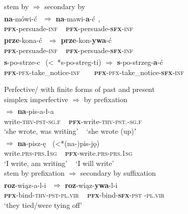 \documentclass[output=paper]{langsci/langscibook}
\begin{document}
\ex
  stem by  ${\Rightarrow}$ secondary  by \\
\gll \textbf{{na}}{-mówi-ć}{\textsuperscript{~}\PFV}   ${\Rightarrow}$     \textbf{{na}}{-mawi-}\textbf{{a}}{-ć}{\textsuperscript{~}\IPFV},\\
\textbf{\textsc{pfx}}-persuade-\textsc{inf}   ~   \textbf{\textsc{pfx}}-persuade-\textbf{\textsc{sfx}}-\textsc{inf}\\

\gll \textbf{{prze}}{-kona-ć}{\textsuperscript{~}\PFV}  ${\Rightarrow}$     \textbf{{prze}}{-kon-}\textbf{{ywa}}{-ć}{\textsuperscript{~}\IPFV}\\
\textbf{\textsc{pfx}}-persuade-\textsc{inf}   ~   \textbf{\textsc{pfx}}-persuade-\textbf{\textsc{sfx}}-\textsc{inf}\\

\gll \textbf{{s}}{-po-strze-c}{\textsuperscript{~}\PFV} (<~*{s-po-streg-ti})   ${\Rightarrow}$   \textbf{{s}}{-po-strzeg-}\textbf{{a}}{-ć}{\textsuperscript{~}\IPFV}\\
\textbf{\textsc{pfx}}\textsc{-pfx}-take\_notice-\textsc{inf} ~ ~ \textbf{\textsc{pfx}}\textsc{-pfx}-take\_notice-\textbf{\textsc{sfx}}-\textsc{inf}\\
\z
\z

\ea
    \label{ex:wiemerserzant:6}
    
      Perfective/  with finite forms of past and present\\
\ea
{simplex imperfective} ${\Rightarrow}$ { by prefixation}\\
    ${\Rightarrow}$   \textbf{{na}}{-pis-a-ł-a}{\textsuperscript{~}\PFV} \\
write-\textsc{thv-pst-sg.f}  ~   \textsc{\textbf{pfx}}-write-\textsc{thv-pst.-sg.f}\\
{‘she wrote, was writing’} ~ {‘she wrote (up)ʼ}\\

   ${\Rightarrow}$   \textbf{{na}}{-pisz-ę}{\textsuperscript{~}\PFV}~(<*(na-)pis-j\k{o})\\
write.\textsc{prs}-\textsc{prs.1sg}          ~     \textsc{\textbf{pfx}}-write.\textsc{prs}-\textsc{prs.1sg}\\
{‘I write, am writing’ } ~  {‘I will write’  }\\

\ex
 { stem by prefixation} ${\Rightarrow}$ {secondary  by suffixation}\\
\gll \textbf{{roz}}{-wiąz-a-l-i}{\textsuperscript{~}\PFV} ${\Rightarrow}$  \textbf{{roz}}{-wiąz-}\textbf{{ywa}}{-l-i}{\textsuperscript{~}\IPFV} \\
\textsc{\textbf{pfx}}-bind-\textsc{thv-pst-pl.vir}  ~    \textsc{\textbf{pfx}}-bind-\textsc{\textbf{sfx}}\textsc{-pst -pl.vir}  \\
\glt ‘they tied/were tying off’
\end{document}
